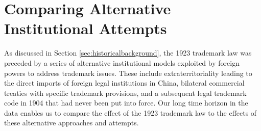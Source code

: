 \documentclass[12pt]{article}
\begin{document}
\begin{comment}
Now consider the case of full trademark protection in which both $s_{1}$
and $s_{2}$ become $0$. Foreign firms would choose distribution via domestic merchants as long as:
\begin{equation}
\left(\frac{\sigma-1}{\sigma\varphi}\right)^{\sigma-1}b_{j}P^{\sigma-1}\left(E_{2}-E_{1}\right)>\mu_{0}.
\end{equation}
Setting the above to equality yields the quality threshold for working with domestic merchants $b'$ given by:
\begin{equation}
b'=\left(\frac{\sigma-1}{\sigma\varphi}\right)^{\sigma-1}P^{\sigma-1}\mu_{0}^{-1}\left(E_{2}-E_{1}\right).
\end{equation}
Firms whose quality exceeds $b'$ will choose to work with domestic merchants to gain access to inland markets; firms whose quality lies
between $b'$ and $b^{*}$ will choose direct marketing.

In this case, the welfare impact of trade protection goes beyond decreases in consumer utility discount $\lambda$ and aggregate price $P$, the two determinants of the welfare in the previous subsection. Instead,the welfare effect can include additionally an increase in market
size $E$ (for firms choosing to work with domestic merchants) and the profit of domestic merchants.

\end{comment}

\section{Comparing Alternative Institutional Attempts} \label{sec:emp_alternative_institutions}


As discussed in Section \ref{sec:historicalbackground}, the 1923 trademark law was preceded by a series of alternative institutional models exploited by foreign powers to address trademark issues. These include extraterritoriality leading to the direct imports of foreign legal institutions in China, bilateral commercial treaties with specific trademark provisions, and a subsequent legal trademark code in 1904 that had never been put into force. Our long time horizon in the data enables us to compare the effect of the 1923 trademark law to the effects of these alternative approaches and attempts.
\end{document}
